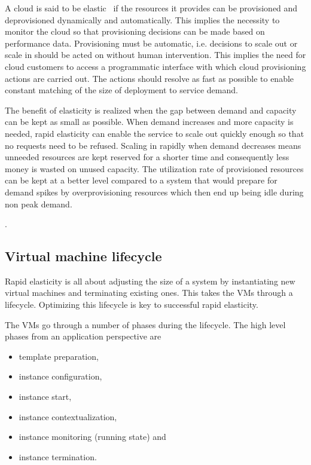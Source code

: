 \documentclass[english]{tktltiki2}
\theoremstyle{definition}
\theoremstyle{remark}
\begin{document}
A cloud is said to be elastic~\cite{nistdefinition} if the resources it provides
can be provisioned and deprovisioned dynamically and automatically. This implies
the necessity to monitor the cloud so that provisioning decisions can be made
based on performance data. Provisioning must be automatic, i.e. decisions to
scale out or scale in should be acted on without human intervention. This
implies the need for cloud customers to access a programmatic interface with
which cloud provisioning actions are carried out. The actions should resolve as
fast as possible to enable constant matching of the size of deployment to
service demand.


The benefit of elasticity is realized when the gap between demand and capacity
can be kept as small as possible. When demand increases and more capacity is
needed, rapid elasticity can enable the service to scale out quickly enough so
that no requests need to be refused. Scaling in rapidly when demand decreases
means unneeded resources are kept reserved for a shorter time and consequently
less money is wasted on unused capacity. The utilization rate of provisioned
resources can be kept at a better level compared to a system that would prepare
for demand spikes by overprovisioning resources which then end up being idle
during non peak demand.

.

\subsection{Virtual machine lifecycle} \label{sec:VMLifeCycle}

Rapid elasticity is all about adjusting the size of a system by instantiating
new virtual machines and terminating existing ones. This takes the VMs through a
lifecycle. Optimizing this lifecycle is key to successful rapid elasticity.

The VMs go through a number of phases during the lifecycle. The high level
phases from an application perspective are

\begin{itemize}
\item template preparation,
\item instance configuration,
\item instance start,
\item instance contextualization,
\item instance monitoring (running state) and 
\item instance termination.
\end{itemize}
\end{document}
